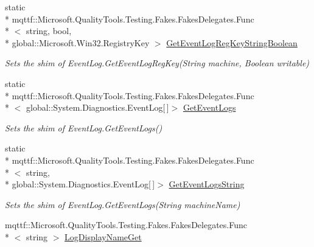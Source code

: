\begin{DoxyCompactItemize}
static \\*
mqttf\-::\-Microsoft.\-Quality\-Tools.\-Testing.\-Fakes.\-Fakes\-Delegates.\-Func\\*
$<$ string, bool, \\*
global\-::\-Microsoft.\-Win32.\-Registry\-Key $>$ \hyperlink{class_system_1_1_diagnostics_1_1_fakes_1_1_shim_event_log_a6b303ef759edeacf5717b18eff334ed1}{Get\-Event\-Log\-Reg\-Key\-String\-Boolean}
\begin{DoxyCompactList}\small\item\em Sets the shim of Event\-Log.\-Get\-Event\-Log\-Reg\-Key(\-String machine, Boolean writable)\end{DoxyCompactList}\item 
static \\*
mqttf\-::\-Microsoft.\-Quality\-Tools.\-Testing.\-Fakes.\-Fakes\-Delegates.\-Func\\*
$<$ global\-::\-System.\-Diagnostics.\-Event\-Log\mbox{[}$\,$\mbox{]}$>$ \hyperlink{class_system_1_1_diagnostics_1_1_fakes_1_1_shim_event_log_abc836178c8a237d53a02a7a92937165d}{Get\-Event\-Logs}
\begin{DoxyCompactList}\small\item\em Sets the shim of Event\-Log.\-Get\-Event\-Logs()\end{DoxyCompactList}\item 
static \\*
mqttf\-::\-Microsoft.\-Quality\-Tools.\-Testing.\-Fakes.\-Fakes\-Delegates.\-Func\\*
$<$ string, \\*
global\-::\-System.\-Diagnostics.\-Event\-Log\mbox{[}$\,$\mbox{]}$>$ \hyperlink{class_system_1_1_diagnostics_1_1_fakes_1_1_shim_event_log_a605ef385524299e6546491565e285c40}{Get\-Event\-Logs\-String}
\begin{DoxyCompactList}\small\item\em Sets the shim of Event\-Log.\-Get\-Event\-Logs(\-String machine\-Name)\end{DoxyCompactList}\item 
mqttf\-::\-Microsoft.\-Quality\-Tools.\-Testing.\-Fakes.\-Fakes\-Delegates.\-Func\\*
$<$ string $>$ \hyperlink{class_system_1_1_diagnostics_1_1_fakes_1_1_shim_event_log_ac14cedf3caf000773f72cf4a405b6a19}{Log\-Display\-Name\-Get}

\end{DoxyCompactItemize}
